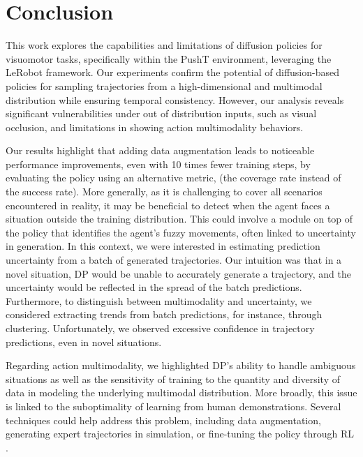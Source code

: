 \section{Conclusion}
\label{sec:conclusion}
This work explores the capabilities and limitations of diffusion policies for visuomotor tasks, specifically within the PushT environment, leveraging the LeRobot framework.
Our experiments confirm the potential of diffusion-based policies for sampling trajectories from a
high-dimensional and multimodal distribution while ensuring temporal consistency.
However, our analysis reveals significant vulnerabilities under out of distribution inputs, such as
visual occlusion, and limitations in showing action multimodality behaviors.

Our results highlight that adding data augmentation leads to noticeable performance improvements, even with 10 times fewer training steps, by evaluating the policy using an alternative metric,
(the coverage rate instead of the success rate).
More generally, as it is challenging to cover all scenarios encountered in reality, it may be beneficial
to detect when the agent faces a situation outside the training distribution. This could involve a module
on top of the policy that identifies the agent's fuzzy movements, often linked to uncertainty in generation.
In this context, we were interested in estimating prediction uncertainty from a batch of generated trajectories.
Our intuition was that in a novel situation, DP would be unable to accurately generate a trajectory,
and the uncertainty would be reflected in the spread of the batch predictions.
Furthermore, to distinguish between multimodality and uncertainty, we considered extracting trends from batch
predictions, for instance, through clustering.
Unfortunately, we observed excessive confidence in trajectory predictions, even in novel situations.


Regarding action multimodality, we highlighted DP's ability to handle ambiguous situations as well as the
sensitivity of training to the quantity and diversity of data in modeling the underlying multimodal distribution.
More broadly, this issue is linked to the suboptimality of learning from human demonstrations.
Several techniques could help address this problem, including data augmentation, generating expert trajectories
in simulation, or fine-tuning the policy through RL \cite{uehara_understanding_2024,ren_diffusion_2024}.
